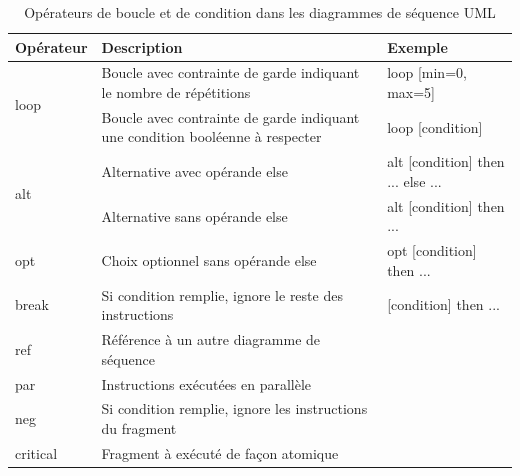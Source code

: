 \begin{table}[H]
\centering
\caption{Opérateurs de boucle et de condition dans les diagrammes de séquence UML}
\label{tbl:uml_loop_cond}
\begin{tabular}{p{7em}|p{18em}|p{14em}}
\toprule
Opérateur & Description & Exemple \\
\midrule
\multirow{2}{*}{loop} 
& Boucle avec contrainte de garde indiquant le nombre de répétitions & loop [min=0, max=5] \\
\cmidrule(lr){2-3}
& Boucle avec contrainte de garde indiquant une condition booléenne à respecter & loop [condition] \\
\cmidrule(lr){1-3}
\multirow{2}{*}{alt} 
& Alternative avec opérande else & alt [condition] then ... else ... \\
\cmidrule(lr){2-3}
& Alternative sans opérande else & alt [condition] then ... \\
\cmidrule(lr){1-3}
opt & Choix optionnel sans opérande else & opt [condition] then ... \\
\cmidrule(lr){1-3}
break & Si condition remplie, ignore le reste des instructions & [condition] then ... \\
\cmidrule(lr){1-3}
ref & Référence à un autre diagramme de séquence & \\
\cmidrule(lr){1-3}
par & Instructions exécutées en parallèle & \\
\cmidrule(lr){1-3}
neg & Si condition remplie, ignore les instructions du fragment & \\
\cmidrule(lr){1-3}
critical & Fragment à exécuté de façon atomique & \\
\bottomrule
\end{tabular}
\end{table}


